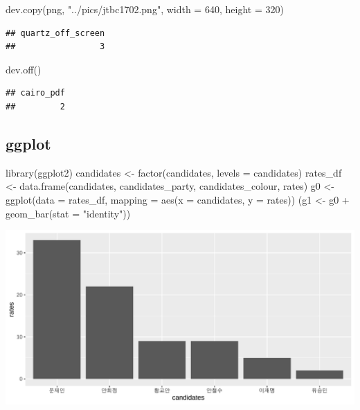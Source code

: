 \documentclass[
]{article}
\newenvironment{Shaded}{}{}
\newcommand{\AttributeTok}[1]{\textcolor[rgb]{0.49,0.56,0.16}{#1}}
\newcommand{\DecValTok}[1]{\textcolor[rgb]{0.25,0.63,0.44}{#1}}
\newcommand{\FunctionTok}[1]{\textcolor[rgb]{0.02,0.16,0.49}{#1}}
\newcommand{\NormalTok}[1]{#1}
\newcommand{\OtherTok}[1]{\textcolor[rgb]{0.00,0.44,0.13}{#1}}
\newcommand{\SpecialCharTok}[1]{\textcolor[rgb]{0.25,0.44,0.63}{#1}}
\newcommand{\StringTok}[1]{\textcolor[rgb]{0.25,0.44,0.63}{#1}}
\begin{document}
\begin{Shaded}
\begin{Highlighting}[]
\FunctionTok{dev.copy}\NormalTok{(png, }\StringTok{"../pics/jtbc1702.png"}\NormalTok{, }\AttributeTok{width =} \DecValTok{640}\NormalTok{, }\AttributeTok{height =} \DecValTok{320}\NormalTok{)}
\end{Highlighting}
\end{Shaded}

\begin{verbatim}
## quartz_off_screen 
##                 3
\end{verbatim}

\begin{Shaded}
\begin{Highlighting}[]
\FunctionTok{dev.off}\NormalTok{()}
\end{Highlighting}
\end{Shaded}

\begin{verbatim}
## cairo_pdf 
##         2
\end{verbatim}

\subsection{ggplot}\label{ggplot}

\begin{Shaded}
\begin{Highlighting}[]
\FunctionTok{library}\NormalTok{(ggplot2)}
\NormalTok{candidates }\OtherTok{\textless{}{-}} \FunctionTok{factor}\NormalTok{(candidates, }\AttributeTok{levels =}\NormalTok{ candidates)}
\NormalTok{rates\_df }\OtherTok{\textless{}{-}} \FunctionTok{data.frame}\NormalTok{(candidates, }
\NormalTok{                       candidates\_party, }
\NormalTok{                       candidates\_colour,}
\NormalTok{                       rates)}
\NormalTok{g0 }\OtherTok{\textless{}{-}} \FunctionTok{ggplot}\NormalTok{(}\AttributeTok{data =}\NormalTok{ rates\_df, }
             \AttributeTok{mapping =} \FunctionTok{aes}\NormalTok{(}\AttributeTok{x =}\NormalTok{ candidates, }
                           \AttributeTok{y =}\NormalTok{ rates))}
\NormalTok{(g1 }\OtherTok{\textless{}{-}}\NormalTok{ g0 }\SpecialCharTok{+}
  \FunctionTok{geom\_bar}\NormalTok{(}\AttributeTok{stat =} \StringTok{"identity"}\NormalTok{))}
\end{Highlighting}
\end{Shaded}

\includegraphics{poll_JTBC_1702_pdf_files/figure-latex/ggplot-1.pdf}
\end{document}
